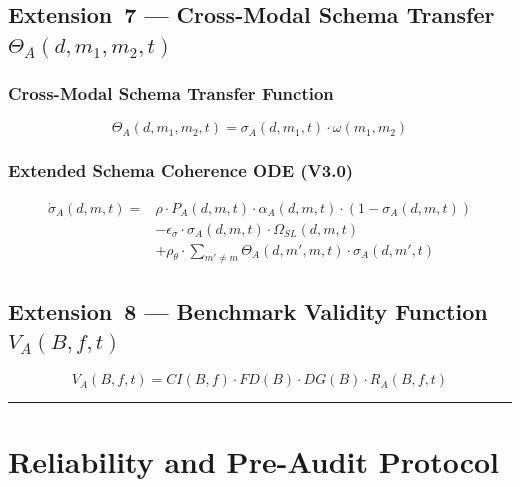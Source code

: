\documentclass[10pt]{article}
\begin{document}
\subsection{Extension~7 --- Cross-Modal Schema Transfer \texorpdfstring{$\Theta_A(d,m_1,m_2,t)$}{Theta\_A(d,m\_1,m\_2,t)}}\label{sec:cross-modal}

\subsubsection{Cross-Modal Schema Transfer Function}
\begin{equation}\label{eq:cross-modal-transfer}
\Theta_A(d, m_1, m_2, t) = \sigma_A(d, m_1, t) \cdot \omega(m_1, m_2)
\end{equation}

\subsubsection{Extended Schema Coherence ODE (V3.0)}
\begin{equation}\label{eq:sigma-ode-v3}
\begin{aligned}
\dot{\sigma}_A(d,m,t) = {} & \rho \cdot P_A(d,m,t) \cdot \alpha_A(d,m,t) \cdot (1 - \sigma_A(d,m,t)) \\
& - \epsilon_{\sigma} \cdot \sigma_A(d,m,t) \cdot \Omega_{SL}(d,m,t) \\
& + \rho_{\theta} \cdot \sum_{m' \neq m} \Theta_A(d,m',m,t) \cdot \sigma_A(d,m',t)
\end{aligned}
\end{equation}

\subsection{Extension~8 --- Benchmark Validity Function \texorpdfstring{$V_A(B,f,t)$}{V\_A(B,f,t)}}\label{sec:validity}

\begin{equation}\label{eq:validity-function}
V_A(B,f,t) = CI(B,f) \cdot FD(B) \cdot DG(B) \cdot R_A(B,f,t) %
\end{equation}

\noindent\rule{\linewidth}{0.4pt}

\section{Reliability and Pre-Audit Protocol}\label{sec:reliability}
\end{document}
